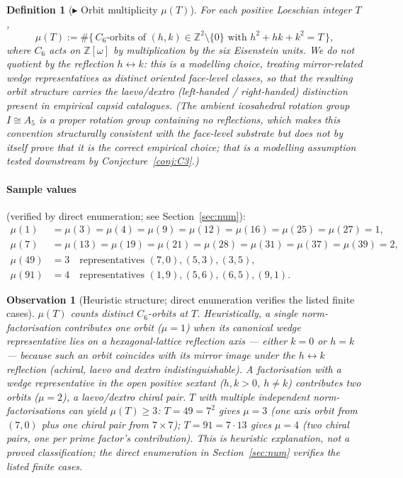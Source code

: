 \documentclass[12pt]{article}
\newtheorem{definition}[theorem]{Definition}
\newtheorem{observation}[theorem]{Observation}
\newcommand{\Zom}{\mathbb{Z}[\omega]}
\begin{document}
\begin{definition}[$\blacktriangleright$ Orbit multiplicity $\mu(T)$]\label{def:D3}
For each positive Loeschian integer $T$,
\[
\mu(T) := \#\{\, C_6\text{-orbits of } (h, k) \in \mathbb{Z}^2\setminus\{0\}
\text{ with } h^2 + hk + k^2 = T\,\},
\]
where $C_6$ acts on $\Zom$ by multiplication by the six Eisenstein
units. We do \emph{not} quotient by the reflection $h \leftrightarrow
k$: this is a modelling choice, treating mirror-related wedge
representatives as distinct oriented face-level classes, so that the
resulting orbit structure carries the laevo/dextro (left-handed /
right-handed) distinction present in empirical capsid catalogues.
(The ambient icosahedral rotation group $I \cong A_5$ is a proper
rotation group containing no reflections, which makes this
convention structurally consistent with the face-level substrate
but does not by itself prove that it is the correct empirical
choice; that is a modelling assumption tested downstream by
Conjecture~\ref{conj:C3}.)
\end{definition}

\paragraph{Sample values} (verified by direct enumeration; see
Section~\ref{sec:num}):
\begin{align*}
\mu(1) &= \mu(3) = \mu(4) = \mu(9) = \mu(12) = \mu(16) = \mu(25) = \mu(27) = 1,\\
\mu(7) &= \mu(13) = \mu(19) = \mu(21) = \mu(28) = \mu(31) = \mu(37) = \mu(39) = 2,\\
\mu(49) &= 3 \quad\text{representatives } (7,0), (5,3), (3,5),\\
\mu(91) &= 4 \quad\text{representatives } (1,9), (5,6), (6,5), (9,1).
\end{align*}

\begin{observation}[Heuristic structure; direct enumeration verifies the listed finite cases]\label{obs:mu-structure}
$\mu(T)$ counts distinct $C_6$-orbits at $T$. Heuristically, a single
norm-factorisation contributes one orbit ($\mu = 1$) when its
canonical wedge representative lies on a hexagonal-lattice reflection
axis --- either $k = 0$ or $h = k$ --- because such an orbit coincides
with its mirror image under the $h \leftrightarrow k$ reflection
(achiral, laevo and dextro indistinguishable). A factorisation with
a wedge representative in the open positive sextant ($h, k > 0$,
$h \neq k$) contributes two orbits ($\mu = 2$), a laevo/dextro
chiral pair. $T$ with multiple independent norm-factorisations can
yield $\mu(T) \ge 3$: $T = 49 = 7^2$ gives $\mu = 3$ (one axis
orbit from $(7, 0)$ plus one chiral pair from $7\times 7$);
$T = 91 = 7\cdot 13$ gives $\mu = 4$ (two chiral pairs, one per prime
factor's contribution). This is heuristic explanation, not a proved
classification; the direct enumeration in Section~\ref{sec:num}
verifies the listed finite cases.
\end{observation}
\end{document}
